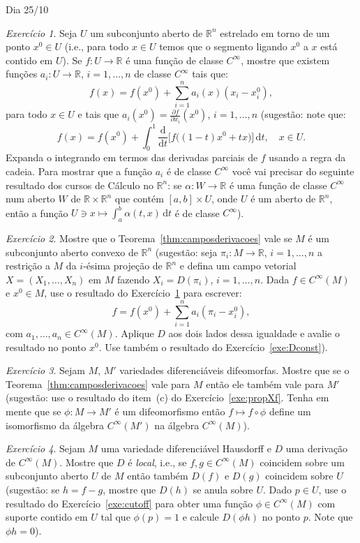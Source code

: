 \documentclass[oneside,11pt]{amsart}
\newcommand{\R}{\mathds R}
\newcommand{\dd}{\mathrm d}
\theoremstyle{remark}\newtheorem{exercise}{Exercício}[section]
\theoremstyle{plain}\newtheorem{teo}{Teorema}[section]
\theoremstyle{plain}\newtheorem{lem}[teo]{Lema}
\theoremstyle{plain}\newtheorem{prop}[teo]{Proposição}
\theoremstyle{definition}\newtheorem{defin}[teo]{Definição}
\theoremstyle{remark}\newtheorem{rem}[teo]{Observação}
\theoremstyle{definition}\newtheorem{example}[teo]{Exemplo}
\numberwithin{equation}{section}
\begin{document}
\begin{section}{Dia 25/10}
\begin{exercise}\label{exe:pigeramideal}
Seja $U$ um subconjunto aberto de $\R^n$ estrelado em torno de um ponto $x^0\in U$ (i.e., para todo $x\in U$ temos que o segmento ligando $x^0$ a $x$ está contido em $U$).
Se $f:U\to\R$ é uma função de classe $C^\infty$, mostre que existem funções $a_i:U\to\R$, $i=1,\ldots,n$ de classe $C^\infty$ tais que:
\[f(x)=f(x^0)+\sum_{i=1}^na_i(x)(x_i-x^0_i),\]
para todo $x\in U$ e tais que $a_i(x^0)=\frac{\partial f}{\partial x_i}(x^0)$, $i=1,\ldots,n$ (sugestão: note que:
\[f(x)=f(x^0)+\int_0^1\frac{\dd}{\dd t}\big[f\big((1-t)x^0+tx\big)\big]\,\dd t,\quad x\in U.\]
Expanda o integrando em termos das derivadas parciais de $f$
usando a regra da cadeia. Para mostrar que a função $a_i$ é de classe $C^\infty$ você vai precisar do seguinte resultado dos
cursos de Cálculo no $\R^n$: se $\alpha:W\to\R$ é uma função de classe $C^\infty$
num aberto $W$ de $\R\times\R^n$ que contém $[a,b]\times U$, onde $U$ é um aberto de $\R^n$, então a função $U\ni x\mapsto\int_a^b\alpha(t,x)\,\dd t$
é de classe $C^\infty$).
\end{exercise}

\begin{exercise}\label{exe:valenoconvexo}
Mostre que o Teorema~\ref{thm:camposderivacoes} vale se $M$ é um subconjunto aberto convexo de $\R^n$ (sugestão: seja $\pi_i:M\to\R$, $i=1,\ldots,n$
a restrição a $M$ da $i$-ésima projeção de $\R^n$ e defina um campo vetorial
$X=(X_1,\ldots,X_n)$ em $M$ fazendo $X_i=D(\pi_i)$, $i=1,\ldots,n$. Dada $f\in C^\infty(M)$ e $x^0\in M$,
use o resultado do Exercício~\ref{exe:pigeramideal} para escrever:
\[f=f(x^0)+\sum_{i=1}^na_i(\pi_i-x^0_i),\]
com $a_1,\ldots,a_n\in C^\infty(M)$.
Aplique $D$ aos dois lados dessa igualdade e avalie o resultado no ponto $x^0$. Use também o resultado do Exercício~\ref{exe:Dconst}).
\end{exercise}

\begin{exercise}\label{exe:difeomorfasXf}
Sejam $M$, $M'$ variedades diferenciáveis difeomorfas. Mostre que se o Teorema~\ref{thm:camposderivacoes} vale para $M$ então ele também vale para $M'$
(sugestão: use o resultado do item~(c) do Exercício~\ref{exe:propXf}. Tenha em mente que se $\phi:M\to M'$ é um difeomorfismo então
$f\mapsto f\circ\phi$ define um isomorfismo da álgebra $C^\infty(M')$ na álgebra $C^\infty(M)$).
\end{exercise}

\begin{exercise}\label{exe:derlocal}
Sejam $M$ uma variedade diferenciável Hausdorff e $D$ uma derivação de $C^\infty(M)$. Mostre que $D$ é {\em local}, i.e., se $f,g\in C^\infty(M)$
coincidem sobre um subconjunto aberto $U$ de $M$ então também $D(f)$ e $D(g)$ coincidem sobre $U$ (sugestão: se $h=f-g$, mostre que $D(h)$ se anula
sobre $U$. Dado $p\in U$, use o resultado do Exercício~\ref{exe:cutoff} para obter uma função $\phi\in C^\infty(M)$ com suporte contido em $U$
tal que $\phi(p)=1$ e calcule $D(\phi h)$ no ponto $p$. Note que $\phi h=0$).
\end{exercise}


\end{section}
\end{document}
